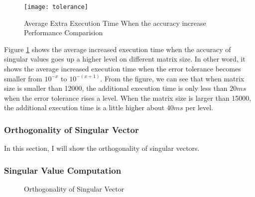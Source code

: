 \begin{figure}[hbpt]
\centering
\texttt{[image: tolerance]}
\caption{Average Extra Execution Time When the accuracy increase Performance Comparision}
\label{fig:tolerance}
\end{figure}
Figure \ref{fig:tolerance} shows the average increased execution time when the accuracy of singular values goes up a higher level on different matrix size.
In other word, it shows the average increased execution time when the error tolerance becomes smaller from $10^{-x}$ to $10^{-(x+1)}$.
From the figure, we can see that when matrix size is smaller than 12000, the additional execution time is only less than $20 ms$ when the error tolerance rises a level.
When the matrix size is larger than 15000, the additional execution time is a little higher about $40 ms$ per level.

\subsubsection{Orthogonality of Singular Vector}
In this section, I will show the orthogonality of singular vectors.
\subsubsection{Singular Value Computation}
\begin{figure}[hbpt]
\vspace{-0.3in}
\centering
\vspace{-0.1in}
  \caption{Orthogonality of Singular Vector}
  \label{fig:svdval}
\vspace{-0.3in}
\end{figure}
